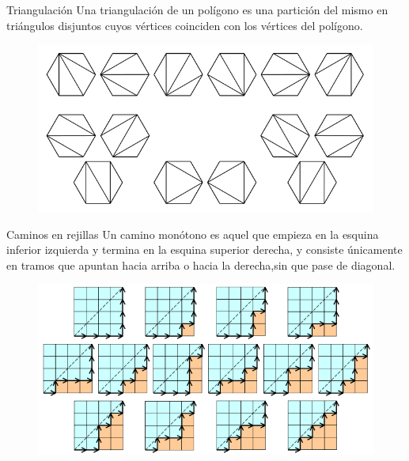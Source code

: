 \begin{frame}
\frametitle{\secname}
\framesubtitle{\subsecname}

\begin{minipage}{0.45\paperwidth}
	\begin{block}{Triangulación}
	Una triangulación de un polígono es una partición del mismo en triángulos disjuntos cuyos vértices coinciden con los vértices del polígono.
	\end{block}
	\begin{figure}
		\centering
		\includegraphics[width=0.4\paperwidth]{ca1}
		\caption{}
	\end{figure}
\end{minipage}
\hfill
\begin{minipage}{0.45\paperwidth}
	\begin{block}{Caminos en rejillas}
		Un camino monótono es aquel que empieza en la esquina inferior izquierda y termina en la esquina superior derecha, y consiste únicamente en tramos que apuntan hacia arriba o hacia la derecha,sin que pase de diagonal.
	\end{block}
	\begin{figure}
		\centering
		\includegraphics[width=0.4\paperwidth]{ca(1)}
		\caption{}
	\end{figure}
\end{minipage}
\end{frame}